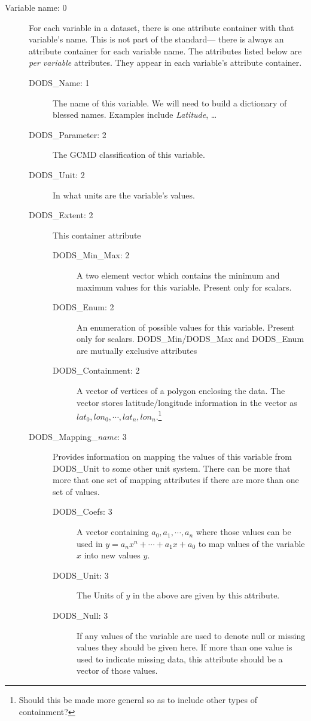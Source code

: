 \documentclass[12pt]{article}
\begin{document}
\begin{description}
\item [Variable name: 0] For each variable in a dataset, there is one attribute
  container with that variable's name. This is not part of the standard---
  there is always an attribute container for each variable name. The
  attributes listed below are \emph{per variable} attributes. They appear in
  each variable's attribute container.

  \begin{description}

  \item [DODS\_Name: 1] The name of this variable. We will need to build a
    dictionary of blessed names. Examples include \emph{Latitude}, \ldots
  \item [DODS\_Parameter: 2] The GCMD classification of this variable.
  \item [DODS\_Unit: 2] In what units are the variable's values.

  \item [DODS\_Extent: 2] This container attribute 
    \begin{description}
    \item [DODS\_Min\_Max: 2] A two element vector which contains the minimum
      and maximum values for this variable. Present only for scalars.
    \item [DODS\_Enum: 2] An enumeration of possible values for this variable.
      Present only for scalars. DODS\_Min/DODS\_Max and DODS\_Enum are mutually
      exclusive attributes
    \item [DODS\_Containment: 2] A vector of vertices of a polygon enclosing
      the data. The vector stores latitude/longitude information in the
      vector as $lat_{0},lon_{0}, \cdots, lat_{n},lon_{n}$.\footnote{Should
  this be made more general so as to include other types of containment?}
    \end{description}

  \item [DODS\_Mapping\_\emph{name}: 3] Provides information on mapping the
    values of this variable from DODS\_Unit to some other unit system. There
    can be more that more that one set of mapping attributes if there are more
    than one set of values.

    \begin{description}

    \item [DODS\_Coefs: 3] A vector containing $a_{0}, a_{1}, \cdots, a_{n}$
      where those values can be used in $y = a_{n}x^{n} + \cdots + a_{1}x +
      a_{0}$ to map values of the variable $x$ into new values $y$.
    \item [DODS\_Unit: 3] The Units of $y$ in the above are given by this
      attribute. 
    \item [DODS\_Null: 3] If any values of the variable are used to denote
      null or missing values they should be given here. If more than one
      value is used to indicate missing data, this attribute should be a
      vector of those values.


\end{description}
\end{description}
\end{description}
\end{document}
